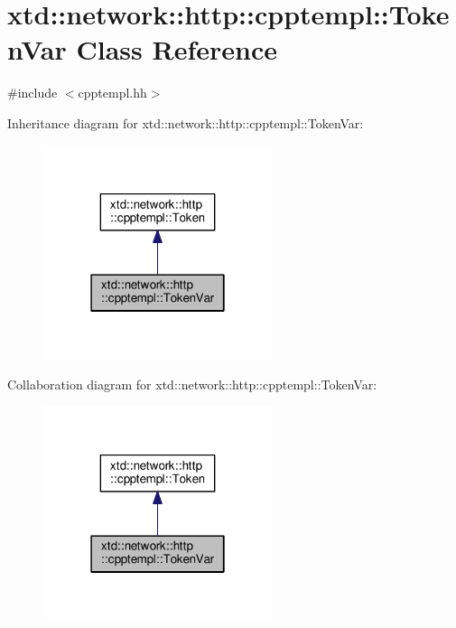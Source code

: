 \hypertarget{classxtd_1_1network_1_1http_1_1cpptempl_1_1TokenVar}{}\section{xtd\+:\+:network\+:\+:http\+:\+:cpptempl\+:\+:Token\+Var Class Reference}
\label{classxtd_1_1network_1_1http_1_1cpptempl_1_1TokenVar}


{\ttfamily \#include $<$cpptempl.\+hh$>$}



Inheritance diagram for xtd\+:\+:network\+:\+:http\+:\+:cpptempl\+:\+:Token\+Var\+:
\nopagebreak
\begin{figure}[H]
\begin{center}
\leavevmode
\includegraphics[width=190pt]{classxtd_1_1network_1_1http_1_1cpptempl_1_1TokenVar__inherit__graph}
\end{center}
\end{figure}


Collaboration diagram for xtd\+:\+:network\+:\+:http\+:\+:cpptempl\+:\+:Token\+Var\+:
\nopagebreak
\begin{figure}[H]
\begin{center}
\leavevmode
\includegraphics[width=190pt]{classxtd_1_1network_1_1http_1_1cpptempl_1_1TokenVar__coll__graph}
\end{center}
\end{figure}
